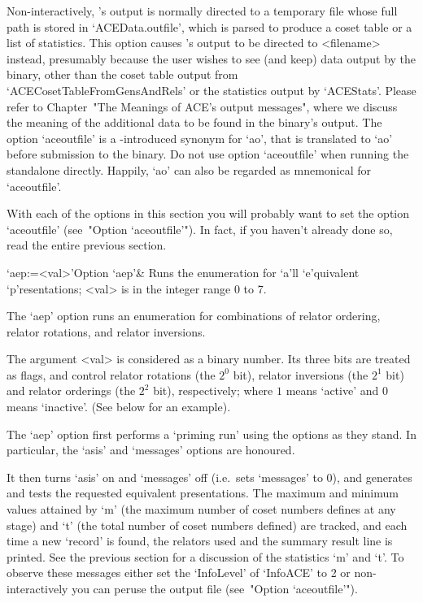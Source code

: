 Non-interactively, {\ACE}'s output is normally directed to a temporary
file whose full path is stored in `ACEData.outfile', which  is  parsed
to produce a coset table or a list of statistics. This  option  causes
{\ACE}'s output to  be  directed  to  <filename>  instead,  presumably
because the user wishes to see (and keep) data output  by  the  {\ACE}
binary,    other    than    the    coset     table     output     from
`ACECosetTableFromGensAndRels' or the statistics output by `ACEStats'.
Please refer to Chapter~"The Meanings of ACE's output messages", where
we discuss the meaning of the additional  data  to  be  found  in  the
{\ACE} binary's output. The option `aceoutfile' is a {\GAP}-introduced
synonym for `ao', that is translated to `ao' before submission to  the
{\ACE} binary.  Do  not  use  option  `aceoutfile'  when  running  the
standalone directly. Happily, `ao' can also be regarded as  mnemonical
for `aceoutfile'.

\enditems


With each of the options in this section you will probably want to set
the option `aceoutfile' (see~"Option `aceoutfile'").  In  fact,  if  you
haven't already done so,  read  the  entire  previous  section.

\beginitems

\>`aep:=<val>'{Option `aep'}&
Runs  the enumeration for `a'll `e'quivalent `p'resentations;
<val> is in the integer range 0 to 7.

\enditems

The `aep' option runs  an  enumeration  for  combinations  of  relator
ordering, relator rotations, and relator inversions.

The argument <val> is considered as a binary number.  Its  three  bits
are treated as flags, and control relator rotations (the  $2^0$  bit),
relator inversions (the $2^1$ bit) and relator  orderings  (the  $2^2$
bit),  respectively;  where  $1$  means  \lq{}active'  and  $0$  means
\lq{}inactive'. (See below for an example).

The `aep' option first performs a \lq{}priming run' using the  options
as they stand. In particular, the `asis' and  `messages'  options  are
honoured.

It then turns `asis' on and `messages' off  (i.e.~sets  `messages'  to
0), and generates and tests the  requested  equivalent  presentations.
The maximum and minimum values attained by `m' (the maximum number  of
coset numbers defines at any stage) and `t' (the total number of coset
numbers defined) are tracked, and each  time  a  new  \lq{}record'  is
found, the relators used and the summary result line is  printed.  See
the previous section for a discussion of the statistics `m'  and  `t'.
To observe these messages either set the `InfoLevel' of `InfoACE' to 2
or  non-interactively  you  can  peruse   the   {\ACE}   output   file
(see~"Option `aceoutfile'").

